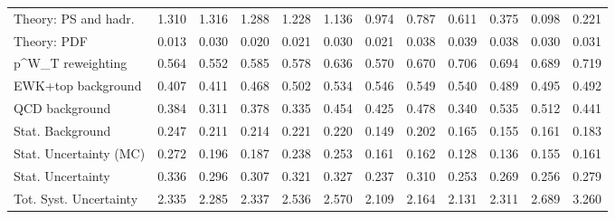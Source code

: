 \begin{tabular}{l|p{0.6cm}p{0.6cm}p{0.6cm}p{0.6cm}p{0.6cm}p{0.6cm}p{0.6cm}p{0.6cm}p{0.6cm}p{0.6cm}p{0.6cm}}
Theory: PS and hadr.                     & 1.310 & 1.316 & 1.288 & 1.228 & 1.136 & 0.974 & 0.787 & 0.611 & 0.375 & 0.098 & 0.221 \\
Theory: PDF                              & 0.013 & 0.030 & 0.020 & 0.021 & 0.030 & 0.021 & 0.038 & 0.039 & 0.038 & 0.030 & 0.031 \\
p^{W}_{T} reweighting                    & 0.564 & 0.552 & 0.585 & 0.578 & 0.636 & 0.570 & 0.670 & 0.706 & 0.694 & 0.689 & 0.719 \\
EWK+top background                       & 0.407 & 0.411 & 0.468 & 0.502 & 0.534 & 0.546 & 0.549 & 0.540 & 0.489 & 0.495 & 0.492 \\
QCD background                           & 0.384 & 0.311 & 0.378 & 0.335 & 0.454 & 0.425 & 0.478 & 0.340 & 0.535 & 0.512 & 0.441 \\
Stat. Background                         & 0.247 & 0.211 & 0.214 & 0.221 & 0.220 & 0.149 & 0.202 & 0.165 & 0.155 & 0.161 & 0.183 \\
Stat. Uncertainty (MC)                   & 0.272 & 0.196 & 0.187 & 0.238 & 0.253 & 0.161 & 0.162 & 0.128 & 0.136 & 0.155 & 0.161 \\
\hline
Stat. Uncertainty                        & 0.336 & 0.296 & 0.307 & 0.321 & 0.327 & 0.237 & 0.310 & 0.253 & 0.269 & 0.256 & 0.279 \\
\hline
Tot. Syst. Uncertainty                   & 2.335 & 2.285 & 2.337 & 2.536 & 2.570 & 2.109 & 2.164 & 2.131 & 2.311 & 2.689 & 3.260 \\
\hline
\end{tabular}
